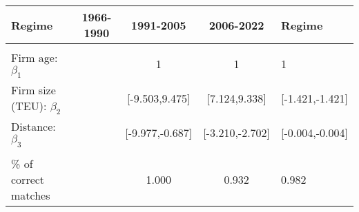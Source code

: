 
\begin{tabular}[t]{lcccl}
\toprule
Regime & 1966-1990 & 1991-2005 & 2006-2022 & Regime\\
\midrule
 &  &  &  \vphantom{1} & \\
Firm age: $\beta_1$ &  & 1 & 1 & 1\\
Firm size (TEU): $\beta_2$ &  & {}[-9.503,9.475] & {}[7.124,9.338] & {}[-1.421,-1.421]\\
Distance: $\beta_3$ &  & {}[-9.977,-0.687] & {}[-3.210,-2.702] & {}[-0.004,-0.004]\\
 &  &  &  & \\
\% of correct matches &  & 1.000 & 0.932 & 0.982\\
\bottomrule
\end{tabular}

